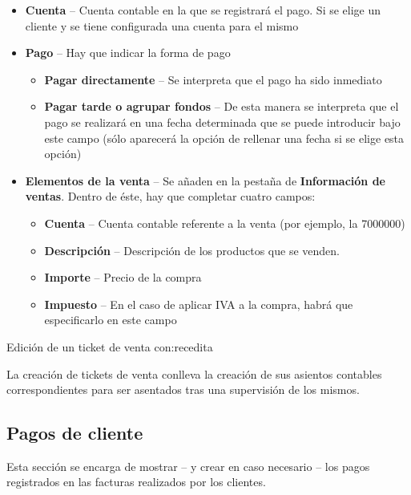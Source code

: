 \begin{itemize}

  \item \textbf{Cuenta} -- Cuenta contable en la que se registrará el pago. Si se elige un cliente y se tiene configurada una cuenta para el
          mismo
  \item \textbf{Pago} -- Hay que indicar la forma de pago
      \begin{itemize}
         \item \textbf{Pagar directamente} -- Se interpreta que el pago ha sido inmediato
         \item \textbf{Pagar tarde o agrupar fondos} -- De esta manera se interpreta que el pago se realizará en una fecha determinada que se puede
              introducir bajo este campo (sólo aparecerá la opción de rellenar una fecha si se elige esta opción)
      \end{itemize}

  \item \textbf{Elementos de la venta} -- Se añaden en la pestaña de \textbf{Información de ventas}. Dentro de éste, hay que completar cuatro
 campos:
      \begin{itemize}
         \item \textbf{Cuenta} -- Cuenta contable referente a la venta (por ejemplo, la 7000000)
         \item \textbf{Descripción} --  Descripción de los productos que se venden.
         \item \textbf{Importe} -- Precio de la compra
         \item \textbf{Impuesto} -- En el caso de aplicar IVA a la compra, habrá que especificarlo en este campo
      \end{itemize}
\end{itemize}



{Edición de un ticket de venta}
{con:recedita}


La creación de tickets de venta conlleva la creación de sus asientos contables correspondientes para ser asentados tras una supervisión de los mismos.




\subsection{Pagos de cliente}

Esta sección se encarga de mostrar -- y crear en caso necesario -- los pagos registrados en las facturas realizados por los clientes.


